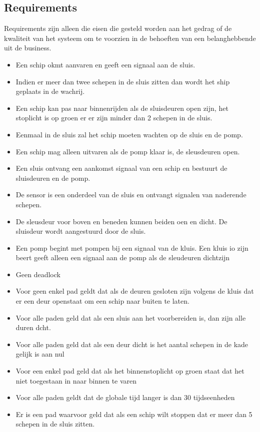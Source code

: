 \subsection{Requirements}
Requirements zijn alleen die eisen die gesteld worden aan het gedrag of de kwaliteit van het systeem om te voorzien in de behoeften van een belanghebbende uit de business.

\begin{itemize}
	\item Een schip okmt aanvaren en geeft een signaal aan de sluis. 	
	\item Indien er meer dan twee schepen in de sluis zitten dan wordt het ship geplaats in de wachrij. 
	\item Een schip kan pas naar binnenrijden als de sluisdeuren open zijn, het stoplicht is op groen er er zijn minder dan 2 schepen in de sluis. 	
	\item Eenmaal in de sluis zal het schip moeten wachten op de sluis en de pomp. 	
	\item Een schip mag alleen uitvaren als de pomp klaar is, de sleusdeuren open. 
	\item Een sluis ontvang een aankomst signaal van een schip en bestuurt de sluisdeuren en de pomp. 
	\item De sensor is een onderdeel van de sluis en ontvangt signalen van naderende schepen. 
	\item De sleusdeur voor boven en beneden kunnen beiden oen en dicht. De sluisdeur wordt aangestuurd door de sluis. 
	\item Een pomp begint met pompen bij een signaal van de kluis. Een kluis io zijn beert geeft alleen een signaal aan de pomp als de sleudeuren dichtzijn
	\item Geen deadlock
	\item Voor geen enkel pad geldt dat als  de deuren gesloten zijn volgens de kluis dat er een deur openstaat om een schip naar buiten te laten.
	\item Voor alle paden geld dat als een sluis aan het voorbereiden is, dan zijn alle duren dcht.
	\item Voor alle paden geld dat als een deur dicht is het aantal schepen in de kade gelijk is aan nul	
	\item Voor een enkel pad geld dat als het binnenstoplicht op groen staat dat het niet toegestaan in naar binnen te varen
	\item Voor alle paden geldt dat de globale tijd langer is dan 30 tijdseenheden
	\item Er is een pad waarvoor geld dat als een schip wilt stoppen dat er meer dan 5 schepen in de sluis zitten.

\end{itemize}
